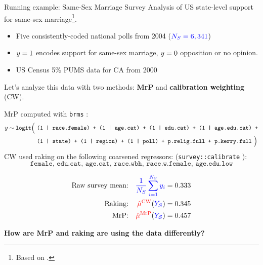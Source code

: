





\begin{frame}{Running example: Same-Sex Marriage Survey}
Analysis of US state-level support for same-sex marriage\footnote{
    Based on \textcite{lax:2009:gay,kastellec:2010:laxmrp}.}.

\begin{itemize}
    \item {} Five consistently-coded national polls from 2004 
        ($\textcolor{blue}{{\textcolor{blue}{N_S}} ={}6,341}$)
    \item {}  $y = 1$ encodes support for same-sex marriage, $y = 0$ opposition
       or no opinion.
    \item {} US Census 5\% PUMS data for CA from 2000
\end{itemize}

\pause
Let's analyze this data with two methods: \textbf{MrP} and \textbf{calibration weighting} (CW).

\pause
MrP computed with \texttt{brms} \parencite{brms}:\\
{
\tiny
$$
\begin{aligned}
y \sim{}& \texttt{logit}\Big(~\texttt{(1 | race.female) + (1 | age.cat) + 
  (1 | edu.cat) + (1 | age.edu.cat) +}
  \\{}&\qquad\quad\;\; \texttt{(1 | state) + (1 | region) + (1 | poll) +
  p.relig.full + p.kerry.full}~\Big)
\end{aligned}
$$
}
%
CW used raking on the following coarsened regressors:
({\tiny{\texttt{survey::calibrate}}} \textcite{lumley:2025:survey}):
{
\tiny
$$
\texttt{female, edu.cat, age.cat, race.wbh, race.w.female, age.edu.low}
$$
}
%
\pause
%
\begin{minipage}{0.5\textwidth}
\vspace{-1.5em}
$$
\begin{aligned}
    \textrm{Raw survey mean:} && \textcolor{blue}{\frac{1}{{\textcolor{blue}{N_S}}} \sum_{i=1}^{\textcolor{blue}{N_S}} y_i} ={}& 0.333 \\
    \textrm{Raking:} && \textcolor{red}{\hat{\mu}^{\mathrm{CW}}}(\textcolor{blue}{\textcolor{blue}{Y_{\mathcal{S}}}}) ={}& 0.345 \\
    \textrm{MrP:} && \textcolor{red}{\hat{\mu}^{\mathrm{MrP}}}(\textcolor{blue}{\textcolor{blue}{Y_{\mathcal{S}}}}) ={}& 0.457\\
\end{aligned}
$$
\end{minipage}
\hfill
\begin{minipage}{0.4\textwidth}
\vspace{-1.5em}
    \pause
    \textbf{How are MrP and raking are using the data differently?}
\end{minipage}
%
%
\end{frame}

